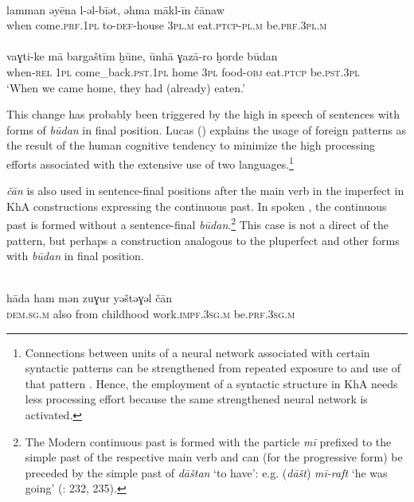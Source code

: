 \documentclass[output=paper,nonflat]{langsci/langscibook}
\begin{document}
\ea {}\\
\gll lamman əyēna l-əl-bīət, əhma mākl-īn čānaw\\
     when come.\textsc{prf.1pl} to-\textsc{def}-house 3\textsc{pl}.\textsc{m} eat.\textsc{ptcp-pl.m} be.\textsc{prf}.\textsc{3pl.m}\\

\\
\gll vaɣti-ke mā bargaštīm ḫūne, ūnhā ɣazā-ro ḫorde būdan  \\
     when-\textsc{rel} \textsc{1pl} come\_back.\textsc{pst}.\textsc{1pl} home 3\textsc{pl} food-\textsc{obj} eat.\textsc{ptcp} be.\textsc{pst}.\textsc{3pl}\\
\glt ‘When we came home, they had (already) eaten.’
\z
\z

This  change has probably been triggered by the high  in speech of  sentences with forms of \textit{būdan} in final position. Lucas (\citeyear[295]{Lucas2012}) explains the usage of foreign patterns as the result of the human cognitive tendency to minimize the high processing efforts associated with the extensive use of two languages.\footnote{{Connections between units of a neural network associated with certain syntactic patterns can be strengthened from repeated exposure to and use of that pattern} {\citep[291]{Lucas2012}. Hence, the employment of a  syntactic structure in KhA needs less processing effort because the same strengthened neural network is activated.}}

\textit{čān} is also used in sentence-final positions after the main verb in the imperfect in KhA constructions expressing the continuous past. In spoken , the continuous past is formed without a sentence-final \textit{būdan}.\footnote{The Modern   continuous past is formed with the particle \textit{mī} prefixed to the simple past of the respective main verb and can (for the progressive form) be preceded by the simple past of \textit{dāštan} ‘to have’: e.g. (\textit{dāšt}) \textit{mī-raft} ‘he was going’ (\citealt{Majidi1990}: 232, 235).} This case is not a direct  of the  pattern, but perhaps a construction analogous to the pluperfect and other  forms with \textit{būdan} in final position. 

\ea
{}\\
\gll hāda ham mən zuɣur yəštəɣəl čān  \\
     \textsc{dem}.\textsc{sg}.\textsc{m} also from childhood work.\textsc{impf.3sg.m} be.\textsc{prf.3sg.m}\\
 
\end{document}
